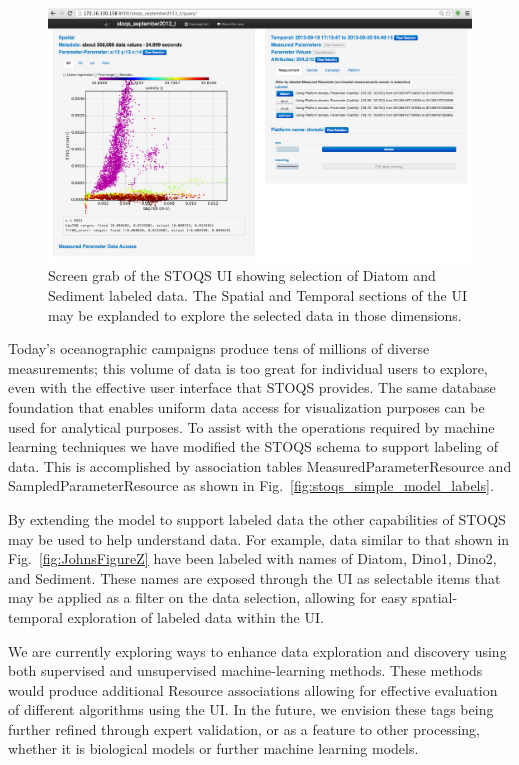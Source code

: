 \documentclass[conference]{IEEEtran}
\begin{document}
\begin{figure}[htbp]
\centering
\includegraphics[width=0.9\linewidth]{LabeledSelectionUI.png}
\caption{Screen grab of the STOQS UI showing selection of Diatom and Sediment labeled data. The Spatial and Temporal sections of the UI may be explanded to explore the selected data in those dimensions.}
\label{fig:LabeledSelectionUI}
\end{figure}

Today's oceanographic campaigns produce tens of millions of diverse measurements; this volume of data is too great for individual users to explore, even with the effective user interface that STOQS provides.  The same database foundation that enables uniform data access for visualization purposes can be used for analytical purposes. To assist with the operations required by machine learning techniques we have modified the STOQS schema to support labeling of data. This is accomplished by association tables MeasuredParameterResource and SampledParameterResource as shown in Fig.~\ref{fig:stoqs_simple_model_labels}.

By extending the model to support labeled data the other capabilities of STOQS may be used to help understand data. For example, data similar to that shown in Fig.~\ref{fig:JohnsFigureZ} have been labeled with names of Diatom, Dino1, Dino2, and Sediment. These names are exposed through the UI as selectable items that may be applied as a filter on the data selection, allowing for easy spatial-temporal exploration of labeled data within the UI.

We are currently exploring ways to enhance data exploration and discovery using both supervised and unsupervised machine-learning methods.  These methods would produce additional Resource associations allowing for effective evaluation of different algorithms using the UI.  In the future, we envision these tags being further refined through expert validation, or as a feature to other processing, whether it is biological models or further machine learning models. 
\end{document}
